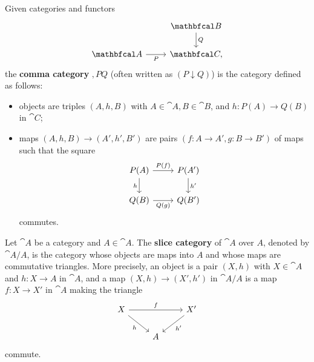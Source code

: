 \documentclass[11pt,a4paper]{article}
\begin{document}
\begin{definition}
    Given categories and functors
    \begin{equation*}
    \begin{tikzcd}
        & \cat{B} \arrow[d, "Q"]\\
        \cat{A} \arrow[r, "P"'] & \cat{C},
    \end{tikzcd}
    \end{equation*}
    the \textbf{comma category} $\comma{P}{Q}$ (often written as $(P\downarrow Q)$) is the category defined as follows:
    \begin{itemize}
        \item objects are triples $(A,h,B)$ with $A\in\cat{A}, B\in\cat{B}$, and $h: P(A)\to Q(B)$ in $\cat{C}$;
        \item maps $(A,h,B)\to (A',h',B')$ are pairs $(f:A\to A', g:B\to B')$ of maps such that the square
            \begin{equation*}
            \begin{tikzcd}
                P(A) \arrow[r, "P(f)"] \arrow[d, "h"'] & P(A') \arrow[d, "h'"] \\
                Q(B) \arrow[r, "Q(g)"'] & Q(B')
            \end{tikzcd}
            \end{equation*}
            commutes.
    \end{itemize}
\end{definition}

\begin{example}
    Let $\cat{A}$ be a category and $A\in\cat{A}$. The \textbf{slice category} of $\cat{A}$ over $A$, denoted by $\cat{A}/A$, is the category whose objects are maps into $A$ and whose maps are commutative triangles. More precisely, an object is a pair $(X,h)$ with $X\in\cat{A}$ and $h:X\to A$ in $\cat{A}$, and a map $(X,h)\to (X',h')$ in $\cat{A}/A$ is a map $f: X\to X'$ in $\cat{A}$ making the triangle
    \begin{equation*}
    \begin{tikzcd}
        X \arrow[rr, "f"] \arrow[dr, "h"'] && X' \arrow[dl, "h'"] \\
        & A
    \end{tikzcd}
    \end{equation*}
    commute.
\end{example}
\end{document}
